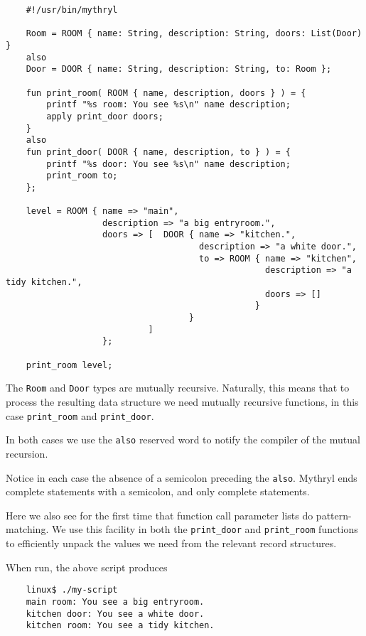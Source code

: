 \begin{verbatim}
    #!/usr/bin/mythryl

    Room = ROOM { name: String, description: String, doors: List(Door) }
    also
    Door = DOOR { name: String, description: String, to: Room };

    fun print_room( ROOM { name, description, doors } ) = {
        printf "%s room: You see %s\n" name description;
        apply print_door doors; 
    }
    also
    fun print_door( DOOR { name, description, to } ) = {
        printf "%s door: You see %s\n" name description;
        print_room to;
    };

    level = ROOM { name => "main",
                   description => "a big entryroom.", 
                   doors => [  DOOR { name => "kitchen.",
                                      description => "a white door.",
                                      to => ROOM { name => "kitchen", 
                                                   description => "a tidy kitchen.",
                                                   doors => []
                                                 }
                                    }
                            ] 
                   };

    print_room level;
\end{verbatim}

The {\tt Room} and {\tt Door} types are mutually recursive.  Naturally, 
this means that to process the resulting data structure we need 
mutually recursive functions, in this case {\tt print\_room} and {\tt print\_door}.

In both cases we use the {\tt also} 
reserved word to notify the compiler 
of the mutual recursion.

Notice in each case the absence of a semicolon 
preceding the {\tt also}.  Mythryl ends complete statements 
with a semicolon, and only complete statements.

Here we also see for the first time that function call parameter lists 
do pattern-matching.  We use this facility in both the {\tt print\_door} 
and {\tt print\_room} functions to efficiently unpack the values we 
need from the relevant record structures.

When run, the above script produces

\begin{verbatim}
    linux$ ./my-script
    main room: You see a big entryroom.
    kitchen door: You see a white door.
    kitchen room: You see a tidy kitchen.
\end{verbatim}

